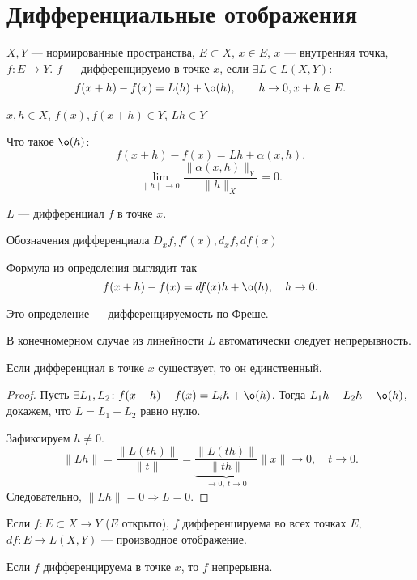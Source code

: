 \section{Дифференциальные отображения}
\begin{defn}
    $ X, Y$ --- нормированные пространства, $ E \subset X$, $ x \in E$, $ x$ --- внутренняя точка, $ f: E \to Y$.
    $ f$ --- {\sf дифференцируемо в точке  $ x$}, если $ \exists L \in L(X, Y) \colon $  
    \[
	f(x+h) - f(x) =L(h) + \o(h), \qquad h \to 0, x + h \in  E
    .\] 
\end{defn}
    \begin{note}
	$ x, h \in X$, $ f(x), f(x+h) \in Y$, $ Lh \in Y$

	Что такое $ \o(h)$:
	\[
	    f(x+h)-f(x) = Lh + \alpha (x, h)
	.\] 
	\[
	    \lim_{\| h \|  \to  0} \frac{\| \alpha (x, h) \| _Y}{\| h \| _X} = 0
	.\] 
    \end{note}
\begin{defn}
    $ L$ --- {\sf дифференциал } $ f$ в точке $ x$.  
\end{defn}
    \begin{name}
	Обозначения дифференциала $ D_x f, f'(x), d_x f, df(x)$ 

	Формула из определения выглядит так
	\[
	    f(x+h) - f(x) = df(x) h + \o(h), \quad h \to 0
	.\] 
    \end{name}
\begin{note}
    Это определение --- дифференцируемость по Фреше.
\end{note}
\begin{note}
    В конечномерном случае из линейности $ L$ автоматически следует непрерывность.
\end{note}
\begin{thm}
    Если дифференциал в точке $ x$ существует, то он единственный.
\end{thm}
\begin{proof}
    Пусть $ \exists L_1,L_2 \colon f(x+h) - f(x) = L_ih + \o(h)$.
    Тогда $ L_1h - L_2h - \o(h)$, докажем, что $ L = L_1- L_2$ равно нулю.

    Зафиксируем $ h \ne 0$.
    \[
	\| Lh \|  = \frac{\| L(th) \| }{\| t \| } = \underbrace{\frac{\| L(th) \| }{\| th \|}}_{ \to  0, ~ t \to 0} \| x \|  \to  0, \quad t  \to 0
    .\] 
    Следовательно, $ \| Lh \|  = 0 \Longrightarrow L=0$.
\end{proof}
\begin{defn}
    Если $ f: E \subset X \to  Y$ ($ E$ открыто), $ f$ дифференцируема во всех точках $ E$, $ df: E \to  L(X, Y)$ --- {\sf производное отображение}.  
\end{defn}
\begin{note}
    Если $ f$ дифференцируема в точке $ x$, то  $ f$ непрерывна.
\end{note}
